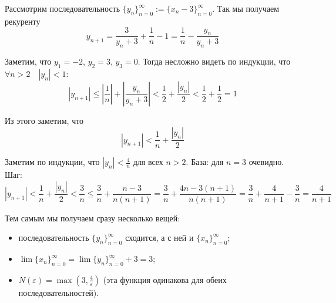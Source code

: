 \documentclass[12pt,a4paper]{article}
\begin{document}
    \begin{enumproblem}[\textcolor{green}{сдано}]
        Рассмотрим последовательность $\{y_n\}_{n=0}^\infty := \{x_n - 3\}_{n=0}^\infty$. Так мы получаем рекуренту
        \[y_{n+1} = \frac{3}{y_n + 3} + \frac{1}{n}-1 = \frac{1}{n}-\frac{y_n}{y_n+3}\]

        Заметим, что $y_1 = -2$, $y_2 = 3$, $y_3 = 0$. Тогда несложно видеть по индукции, что $\forall n > 2 \quad |y_n| < 1$:
        \[|y_{n+1}| \leqslant \left|\frac{1}{n}\right| + \left|\frac{y_n}{y_n + 3}\right| < \frac{1}{2} + \frac{|y_n|}{2} < \frac{1}{2} + \frac{1}{2} = 1\]

        Из этого заметим, что
        \[|y_{n+1}| < \frac{1}{n} + \frac{|y_n|}{2}\]
        
        Заметим по индукции, что $|y_n| < \frac{4}{n}$ для всех $n > 2$. База: для $n=3$ очевидно. Шаг:
        \[|y_{n+1}| < \frac{1}{n} + \frac{|y_n|}{2} < \frac{3}{n} \leqslant \frac{3}{n} + \frac{n-3}{n(n+1)} = \frac{3}{n} + \frac{4n - 3(n+1)}{n(n+1)}=\frac{3}{n} + \frac{4}{n+1}-\frac{3}{n}=\frac{4}{n+1}\]

        Тем самым мы получаем сразу несколько вещей:
        \begin{itemize}
            \item последовательность $\{y_n\}_{n=0}^\infty$ сходится, а с ней и $\{x_n\}_{n=0}^\infty$;
            \item $\lim \{x_n\}_{n=0}^\infty = \lim \{y_n\}_{n=0}^\infty + 3 = 3$;
            \item $N(\varepsilon) = \max(3,\frac{4}{\varepsilon})$ (эта функция одинакова для обеих последовательностей).
        \end{itemize}
    \end{enumproblem}
\end{document}
